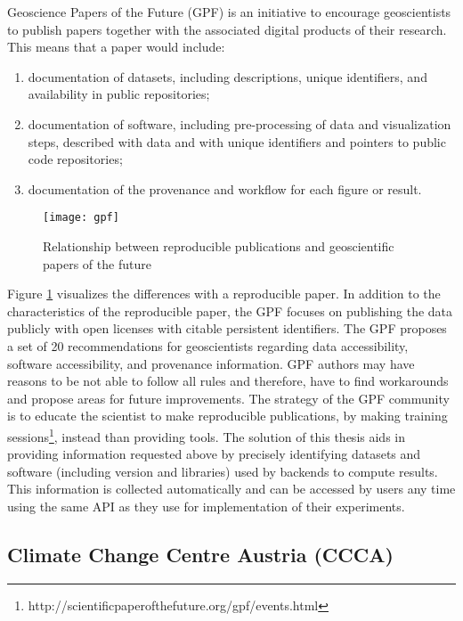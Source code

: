 \documentclass[draft,final]{vutinfth} %
\begin{document}
Geoscience Papers of the Future (GPF) \cite{Gil2016TowardTG}  is an initiative to encourage geoscientists to publish papers together with the associated digital products of their research. This means that a paper would include: 

\begin{enumerate}
	\item documentation of datasets, including descriptions, unique identifiers, and availability in public repositories; 
	\item documentation of software, including pre-processing of data and visualization steps, described with data and with unique identifiers and pointers to public code repositories; 
	\item documentation of the provenance and workflow for each figure or result.
\end{enumerate}

\begin{figure}[h]
	\centering
	\texttt{[image: gpf]}
	\caption{Relationship between reproducible publications and geoscientific papers of the future \cite{Gil2016TowardTG}}
	\label{fig:gpf} %
\end{figure}

Figure \ref{fig:gpf} visualizes the differences with a reproducible paper. In addition to the characteristics of the reproducible paper, the GPF focuses on publishing the data publicly with open licenses with citable persistent identifiers.
The GPF proposes a set of 20 recommendations for geoscientists regarding data accessibility, software accessibility, and provenance information. GPF authors may have reasons to be not able to follow all rules and therefore, have to find workarounds and propose areas for future improvements. The strategy of the GPF community is to educate the scientist to make reproducible publications, by making training sessions\footnote{http://scientificpaperofthefuture.org/gpf/events.html}, instead than providing tools. The solution of this thesis aids in providing information requested above by precisely identifying datasets and software (including version and libraries) used by backends to compute results. This information is collected automatically and can be accessed by users any time using the same API as they use for implementation of their experiments.  

\subsection{Climate Change Centre Austria (CCCA)}
\end{document}
